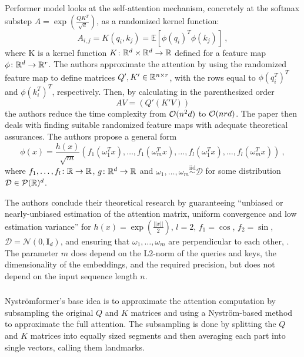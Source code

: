 Performer model \citep{performer} looks at the self-attention mechanism, concretely at the softmax substep $A=\exp(\frac{QK^T}{\sqrt{d}})$, as a randomized kernel function: 
\begin{equation}
    A_{i,j}=K(q_i,k_j)=\mathbb{E}[\phi(q_i)^T\phi(k_j)]\ ,
\end{equation}
where K is a kernel function $K\colon\mathbb{R}^d\times\mathbb{R}^d\rightarrow\mathbb{R}$ defined for a feature map $\phi\colon\mathbb{R}^d\rightarrow\mathbb{R}^r$.
The authors approximate the attention by using the randomized feature map to define matrices $Q', K'\in\mathbb{R}^{n\times r}$, with the rows equal to $\phi(q_i^T)^T$ and $\phi(k_i^T)^T$, respectively.
Then, by calculating in the parenthesized order
\begin{equation}
        AV = (Q'(K'V))
\end{equation}
the authors reduce the time complexity from $\mathcal{O}(n^2d)$ to $\mathcal{O}(nrd)$.
The paper then deals with finding suitable randomized feature maps with adequate theoretical assurances. 
The authors propose a general form
\begin{equation}
        \phi(x)=\frac{h(x)}{\sqrt{m}}(f_1(\omega_1^Tx),\dots,f_1(\omega_m^Tx),
        \dots,f_l(\omega_1^Tx),\dots,f_l(\omega_m^Tx))\ ,
\end{equation}
where $f_1,\dots,f_l\colon\mathbb{R}\rightarrow\mathbb{R}$, $g\colon\mathbb{R}^d\rightarrow\mathbb{R}$ and $\omega_1,\dots,\omega_m\overset{\text{iid}}{\sim}\mathcal{D}$ for some distribution $\mathcal{D}\in\mathcal{P} ( \mathbb{R} )^d$.

The authors conclude their theoretical research by guaranteeing ``unbiased or nearly-unbiased estimation of the attention matrix, uniform convergence and low estimation variance'' for $h(x)=\exp(\frac{||x||}{2})$, $l=2$, $f_1=\cos$, $f_2=\sin$, $\mathcal{D}=\mathcal{N}(0,\textbf{I}_d)$, and ensuring that $\omega_1,\dots,\omega_m$ are perpendicular to each other, \citep[Theorem 4]{performer}.
The parameter $m$ does depend on the L2-norm of the queries and keys, the dimensionality of the embeddings, and the required precision, but does not depend on the input sequence length $n$.

\subsubsection{\nystr{}}

Nystr\"omformer's \citep{nystrom} base idea is to approximate the attention computation by subsampling the original $Q$ and $K$ matrices and using a Nystr\"om-based method to approximate the full attention. 
The subsampling is done by splitting the $Q$ and $K$ matrices into equally sized segments and then averaging each part into single vectors, calling them landmarks.

